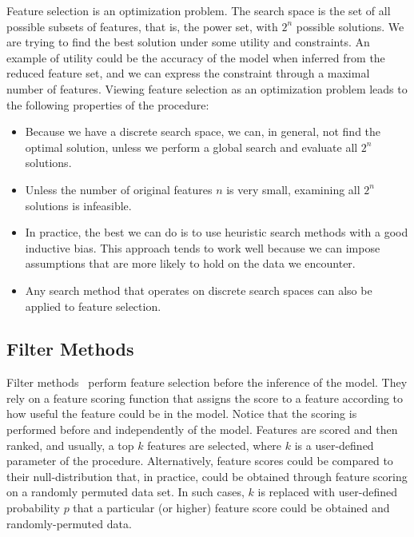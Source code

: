 \begin{refsection}
Feature selection is an optimization problem. The search space is the set of all possible subsets of features, that is, the power set, with $2^n$ possible solutions. We are trying to find the best solution under some utility and constraints. An example of utility could be the accuracy of the model when inferred from the reduced feature set, and we can express the constraint through a maximal number of features. Viewing feature selection as an optimization problem leads to the following properties of the procedure:
\begin{itemize}
\item Because we have a discrete search space, we can, in general, not find the optimal solution, unless we perform a global search and evaluate all $2^n$ solutions.
\item Unless the number of original features $n$ is very small, examining all $2^n$ solutions is infeasible.
\item In practice, the best we can do is to use heuristic search methods with a good inductive bias. This approach tends to work well because we can impose assumptions that are more likely to hold on the data we encounter.
\item Any search method that operates on discrete search spaces can also be applied to feature selection.
\end{itemize}

\subsection*{Filter Methods}

Filter methods~\citep{Guyon2003} perform feature selection before the inference of the model. They rely on a feature scoring function that assigns the score to a feature according to how useful the feature could be in the model. Notice that the scoring is performed before and independently of the model. Features are scored and then ranked, and usually, a top $k$ features are selected, where $k$ is a user-defined parameter of the procedure. Alternatively, feature scores could be compared to their null-distribution that, in practice, could be obtained through feature scoring on a randomly permuted data set. In such cases, $k$ is replaced with user-defined probability $p$ that a particular (or higher) feature score could be obtained and randomly-permuted data.


\end{refsection}
